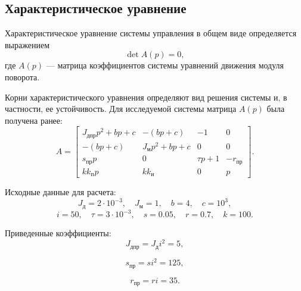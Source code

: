 \subsection{Характеристическое уравнение}

Характеристическое уравнение системы управления в общем виде определяется выражением
\begin{equation}
    \det A(p) = 0,
\end{equation}
где $A(p)$ --- матрица коэффициентов системы уравнений движения модуля поворота.

Корни характеристического уравнения определяют вид решения системы и, в частности, ее устойчивость. Для исследуемой системы матрица $A(p)$ была получена ранее:
\begin{equation}
    A=
    \begin{bmatrix}
        J_{\text{дпр}}p^2+bp+c
        &
        -(bp+c)
        &
        -1
        &
        0
        \\

        -(bp+c)
        &
        J_{\text{м}}p^2+bp+c
        &
        0
        &
        0
        \\

        s_{\text{пр}}p
        &
        0
        &
        \tau p+1
        &
        -r_{\text{пр}}
        \\

        kk_{\text{п}}p
        &
        kk_{\text{и}}
        &
        0
        &
        p
    \end{bmatrix}.
\end{equation}

Исходные данные для расчета:
\[
    J_{\text{д}} = 2 \cdot 10^{-3}, \quad
    J_{\text{м}} = 1, \quad
    b = 4, \quad
    c = 10^3,
\]
\[
    i = 50, \quad
    \tau = 3 \cdot 10^{-3}, \quad
    s = 0.05, \quad
    r = 0.7, \quad
    k = 100.
\]

Приведенные коэффициенты:
\begin{equation}
    J_{\text{дпр}} = J_{\text{д}} i^2 = 5,
\end{equation}

\begin{equation}
    s_{\text{пр}} = s i^2 = 125,
\end{equation}

\begin{equation}
    r_{\text{пр}} = r i = 35.
\end{equation}

